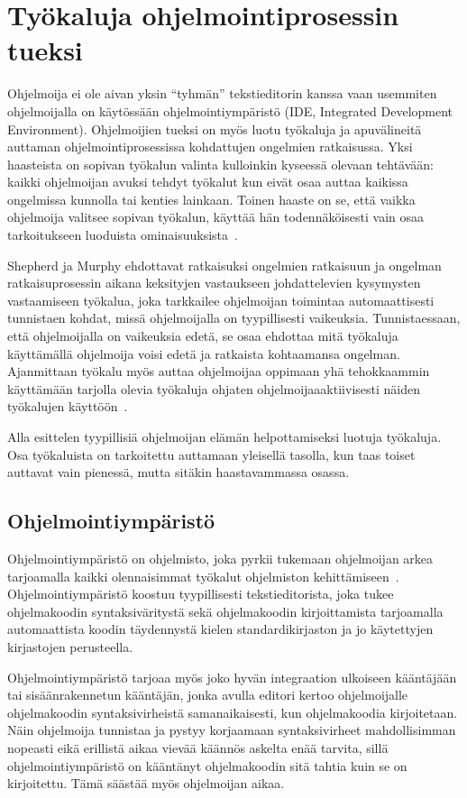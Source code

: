 \documentclass[finnish]{tktltiki2}
\theoremstyle{definition}
\theoremstyle{remark}
\begin{document}
\section{Työkaluja ohjelmointiprosessin tueksi}
Ohjelmoija ei ole aivan yksin ``tyhmän'' tekstieditorin kanssa vaan usemmiten ohjelmoijalla on käytössään ohjelmointiympäristö (IDE, Integrated Development Environment). Ohjelmoijien tueksi on myös luotu työkaluja ja apuvälineitä auttaman ohjelmointiprosessissa kohdattujen ongelmien ratkaisussa.
Yksi haasteista on sopivan työkalun valinta kulloinkin kyseessä olevaan tehtävään: kaikki ohjelmoijan avuksi tehdyt työkalut kun eivät osaa auttaa kaikissa ongelmissa kunnolla tai kenties lainkaan. Toinen haaste on se, että vaikka ohjelmoija valitsee sopivan työkalun, käyttää hän todennäköisesti vain osaa tarkoitukseen luoduista ominaisuuksista~\cite{whyline}.

Shepherd ja Murphy ehdottavat ratkaisuksi ongelmien ratkaisuun ja ongelman ratkaisuprosessin aikana keksityjen vastaukseen johdattelevien kysymysten vastaamiseen työkalua, joka tarkkailee ohjelmoijan toimintaa automaattisesti tunnistaen kohdat, missä ohjelmoijalla on tyypillisesti vaikeuksia. Tunnistaessaan, että ohjelmoijalla on vaikeuksia edetä, se osaa ehdottaa mitä työkaluja käyttämällä ohjelmoija voisi edetä ja ratkaista kohtaamansa ongelman. Ajanmittaan työkalu myös auttaa ohjelmoijaa oppimaan yhä tehokkaammin käyttämään tarjolla olevia työkaluja ohjaten ohjelmoijaaaktiivisesti näiden työkalujen käyttöön~\cite{programmers-coach}.

Alla esittelen tyypillisiä ohjelmoijan elämän helpottamiseksi luotuja työkaluja. Osa työkaluista on tarkoitettu auttamaan yleisellä tasolla, kun taas toiset auttavat vain pienessä, mutta sitäkin haastavammassa osassa.

\subsection{Ohjelmointiympäristö}
Ohjelmointiympäristö on ohjelmisto, joka pyrkii tukemaan ohjelmoijan arkea tarjoamalla kaikki olennaisimmat työkalut ohjelmiston kehittämiseen~\cite{eclipse-ide}. Ohjelmointiympäristö koostuu tyypillisesti tekstieditorista, joka tukee ohjelmakoodin syntaksiväritystä sekä ohjelmakoodin kirjoittamista tarjoamalla automaattista koodin täydennystä kielen standardikirjaston ja jo käytettyjen kirjastojen perusteella.

Ohjelmointiympäristö tarjoaa myös joko hyvän integraation ulkoiseen kääntäjään tai sisäänrakennetun kääntäjän, jonka avulla editori kertoo ohjelmoijalle ohjelmakoodin syntaksivirheistä samanaikaisesti, kun ohjelmakoodia kirjoitetaan. Näin ohjelmoija tunnistaa ja pystyy korjaamaan syntaksivirheet mahdollisimman nopeasti eikä erillistä aikaa vievää käännös askelta enää tarvita, sillä ohjelmointiympäristö on kääntänyt ohjelmakoodin sitä tahtia kuin se on kirjoitettu. Tämä säästää myös ohjelmoijan aikaa.
\end{document}
